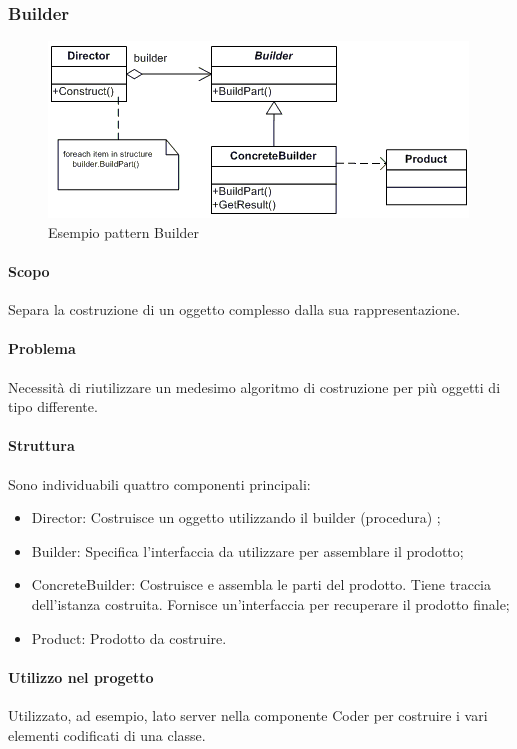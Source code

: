 \documentclass[../PianoDiQualifica.tex]{subfiles}
\begin{document}
			\subsubsection{Builder}
				\begin{figure}[H] \label{fig:Builder}
					\centering
					\includegraphics[scale=0.8]{Immagini/Builder.png}
					\caption{Esempio pattern Builder}
				\end{figure}
				\paragraph{Scopo\\}
					Separa la costruzione di un oggetto complesso dalla
					sua rappresentazione.
				\paragraph{Problema\\}
					Necessità di riutilizzare un medesimo algoritmo di
					costruzione per più oggetti di tipo differente.
				\paragraph{Struttura\\}
					Sono individuabili quattro componenti principali:
					\begin{itemize}
						\item Director: Costruisce un oggetto utilizzando il builder (procedura) ;
						\item Builder: Specifica l’interfaccia da utilizzare per assemblare il prodotto;
						\item ConcreteBuilder: Costruisce e assembla le parti del
						prodotto. Tiene traccia dell’istanza costruita. Fornisce un’interfaccia per recuperare il prodotto finale;
						\item Product: Prodotto da costruire.
					\end{itemize}
				\paragraph{Utilizzo nel progetto\\}
					Utilizzato, ad esempio, lato server nella componente Coder per costruire i vari elementi codificati di una classe.
\end{document}
